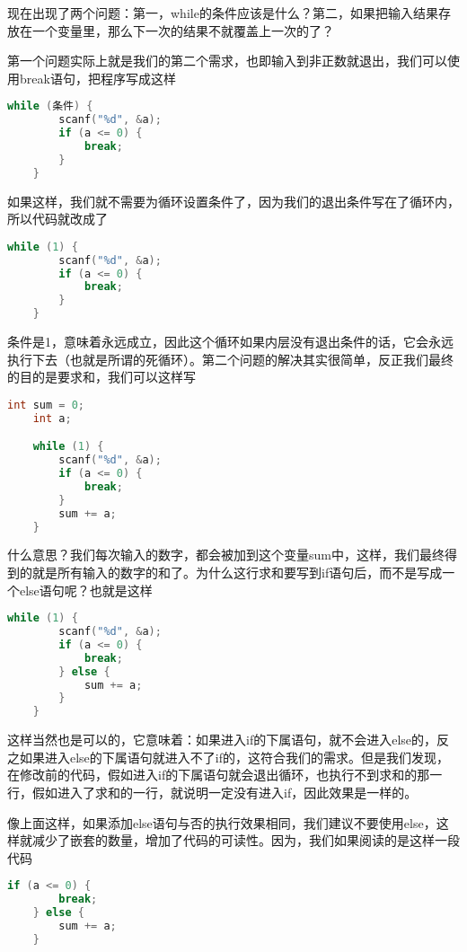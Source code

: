 现在出现了两个问题：第一，while的条件应该是什么？第二，如果把输入结果存放在一个变量里，那么下一次的结果不就覆盖上一次的了？

第一个问题实际上就是我们的第二个需求，也即输入到非正数就退出，我们可以使用break语句，把程序写成这样

\begin{lstlisting}[language=C]
    while (条件) {
        scanf("%d", &a);
        if (a <= 0) {
            break;
        }
    }
\end{lstlisting}

如果这样，我们就不需要为循环设置条件了，因为我们的退出条件写在了循环内，所以代码就改成了

\begin{lstlisting}[language=C]
    while (1) {
        scanf("%d", &a);
        if (a <= 0) {
            break;
        }
    }
\end{lstlisting}

条件是1，意味着永远成立，因此这个循环如果内层没有退出条件的话，它会永远执行下去（也就是所谓的死循环）。第二个问题的解决其实很简单，反正我们最终的目的是要求和，我们可以这样写

\begin{lstlisting}[language=C]
    int sum = 0;
    int a;

    while (1) {
        scanf("%d", &a);
        if (a <= 0) {
            break;
        }
        sum += a;
    }
\end{lstlisting}

什么意思？我们每次输入的数字，都会被加到这个变量sum中，这样，我们最终得到的就是所有输入的数字的和了。为什么这行求和要写到if语句后，而不是写成一个else语句呢？也就是这样

\begin{lstlisting}[language=C]
    while (1) {
        scanf("%d", &a);
        if (a <= 0) {
            break;
        } else {
            sum += a;
        }
    }
\end{lstlisting}

这样当然也是可以的，它意味着：如果进入if的下属语句，就不会进入else的，反之如果进入else的下属语句就进入不了if的，这符合我们的需求。但是我们发现，在修改前的代码，假如进入if的下属语句就会退出循环，也执行不到求和的那一行，假如进入了求和的一行，就说明一定没有进入if，因此效果是一样的。

像上面这样，如果添加else语句与否的执行效果相同，我们建议不要使用else，这样就减少了嵌套的数量，增加了代码的可读性。因为，我们如果阅读的是这样一段代码

\begin{lstlisting}[language=C]
    if (a <= 0) {
        break;
    } else {
        sum += a;
    }
\end{lstlisting}

